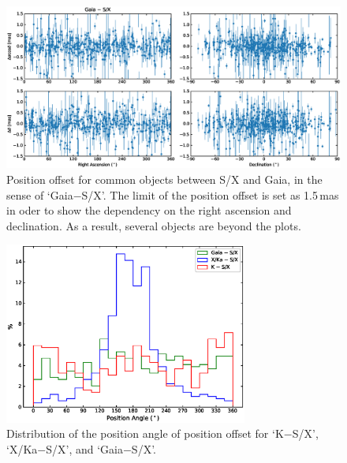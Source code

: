 \documentclass{aa}   %
\begin{document}
\begin{figure}[hbtp]
    \centering
    \includegraphics[width=160mm]{figs/gdr2-sx-pos-offset}
    \caption[]{\label{fig:gdr2-sx-pos-offset}
        Position offset for common objects between S/X and Gaia, in the sense of `Gaia$-$S/X'.
        The limit of the position offset is set as 1.5\,mas in oder to show the dependency on the right ascension and declination.
        As a result, several objects are beyond the plots.
    }
\end{figure}

\begin{figure}[hbtp]
    \centering
    \includegraphics[width=80mm]{figs/pa-hist}
    \caption[]{\label{fig:pa}
        Distribution of the position angle of position offset for `K$-$S/X', `X/Ka$-$S/X', and `Gaia$-$S/X'.
    }
\end{figure}
\end{document}
